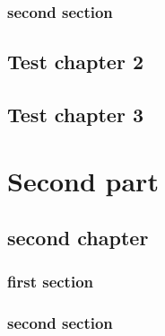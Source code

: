 \documentclass[a5paper,twoside,headsepline,pagesize,10pt,DIV=12]{scrbook}
\begin{document}
    \section{second section}
    \lipsum[1-10]

\chapter{Test chapter 2}
    \ChapFrameEmpty\newpage\ChapFrame
    \lipsum[1-10]
    \lipsum[1-10]

\chapter{Test chapter 3}
    \ChapFrameEmpty\newpage\ChapFrame
    \lipsum[1-10]
    \lipsum[1-10]

\part{Second part}
\chapter{second chapter}
      \section{first section}
      \lipsum[1-2]
      \section{second section}
      \lipsum[1-2]


\backmatter
    {
        \small
        
%         
%       
%       
    }



\end{document}
